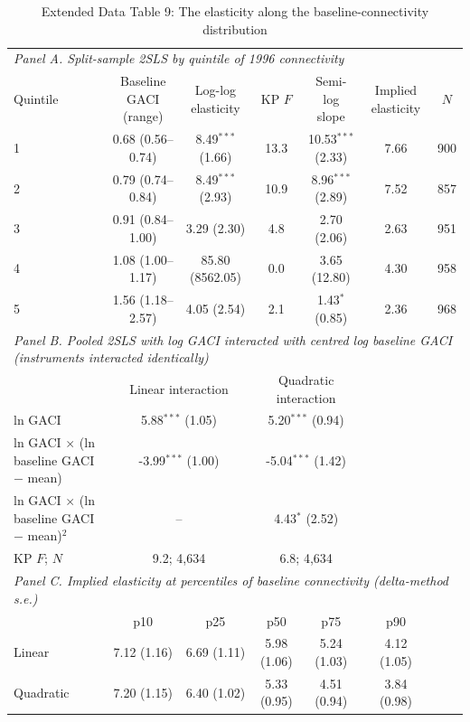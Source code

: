 \documentclass[12pt]{article}
\begin{document}
\begin{table}[htbp]
\centering
\begin{threeparttable}
\caption{Extended Data Table 9: The elasticity along the baseline-connectivity distribution}
\label{tab:gradient}
\footnotesize
\begin{tabular}{lcccccc}
\toprule
\multicolumn{7}{l}{\textit{Panel A. Split-sample 2SLS by quintile of 1996 connectivity}} \\
Quintile & Baseline GACI (range) & Log-log elasticity & KP $F$ & Semi-log slope & Implied elasticity & $N$ \\
\midrule
  1 & 0.68 (0.56--0.74) & 8.49$^{***}$ (1.66) & 13.3 & 10.53$^{***}$ (2.33) & 7.66 & 900 \\
  2 & 0.79 (0.74--0.84) & 8.49$^{***}$ (2.93) & 10.9 & 8.96$^{***}$ (2.89) & 7.52 & 857 \\
  3 & 0.91 (0.84--1.00) & 3.29 (2.30) & 4.8 & 2.70 (2.06) & 2.63 & 951 \\
  4 & 1.08 (1.00--1.17) & 85.80 (8562.05) & 0.0 & 3.65 (12.80) & 4.30 & 958 \\
  5 & 1.56 (1.18--2.57) & 4.05 (2.54) & 2.1 & 1.43$^{*}$ (0.85) & 2.36 & 968 \\
\midrule
\multicolumn{7}{l}{\textit{Panel B. Pooled 2SLS with log GACI interacted with centred log baseline GACI (instruments interacted identically)}} \\
 & \multicolumn{2}{c}{Linear interaction} & \multicolumn{2}{c}{Quadratic interaction} & & \\
  ln GACI & \multicolumn{2}{c}{5.88$^{***}$ (1.05)} & \multicolumn{2}{c}{5.20$^{***}$ (0.94)} & & \\
  ln GACI $\times$ (ln baseline GACI $-$ mean) & \multicolumn{2}{c}{-3.99$^{***}$ (1.00)} & \multicolumn{2}{c}{-5.04$^{***}$ (1.42)} & & \\
  ln GACI $\times$ (ln baseline GACI $-$ mean)$^2$ & \multicolumn{2}{c}{--} & \multicolumn{2}{c}{4.43$^{*}$ (2.52)} & & \\
  KP $F$; $N$ & \multicolumn{2}{c}{9.2; 4,634} & \multicolumn{2}{c}{6.8; 4,634} & & \\
\midrule
\multicolumn{7}{l}{\textit{Panel C. Implied elasticity at percentiles of baseline connectivity (delta-method s.e.)}} \\
 & p10 & p25 & p50 & p75 & p90 & \\
  Linear & 7.12 (1.16) & 6.69 (1.11) & 5.98 (1.06) & 5.24 (1.03) & 4.12 (1.05) & \\
  Quadratic & 7.20 (1.15) & 6.40 (1.02) & 5.33 (0.95) & 4.51 (0.94) & 3.84 (0.98) & \\

\end{tabular}
\end{threeparttable}
\end{table}
\end{document}

